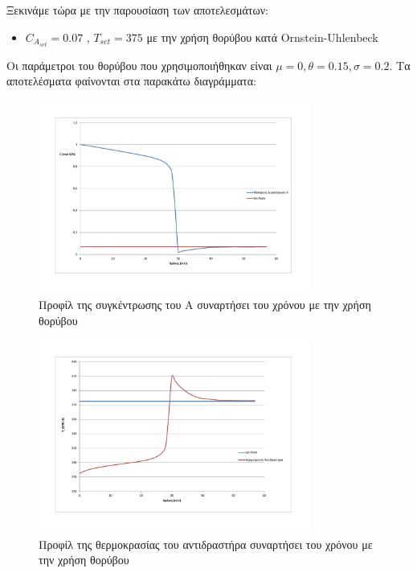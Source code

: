\documentclass[11pt]{article} %
\numberwithin{equation}{subsection}
\begin{document}
Ξεκινάμε τώρα με την παρουσίαση των αποτελεσμάτων:\\
\begin{itemize}
\item $C_{A_{set}} = 0.07$ , $Τ_{set} = 375$ με την χρήση θορύβου κατά Ornstein-Uhlenbeck
\end{itemize}
Οι παράμετροι του θορύβου που χρησιμοποιήθηκαν είναι $\mu = 0, \theta = 0.15, \sigma = 0.2$. Τα αποτελέσματα φαίνονται στα παρακάτω διαγράμματα:
\begin{figure}[H]
    \centering
    \includegraphics[width=0.8\textwidth]{noise_ca.pdf}
    \caption{Προφίλ της συγκέντρωσης του Α συναρτήσει του χρόνου με την χρήση θορύβου}
    \label{fig:noise_ca}
\end{figure}

\begin{figure}[H]
    \centering
    \includegraphics[width=0.8\textwidth]{noise_t.pdf}
    \caption{Προφίλ της θερμοκρασίας του αντιδραστήρα συναρτήσει του χρόνου με την χρήση θορύβου}
    \label{fig:noise_t}
\end{figure}
\end{document}

